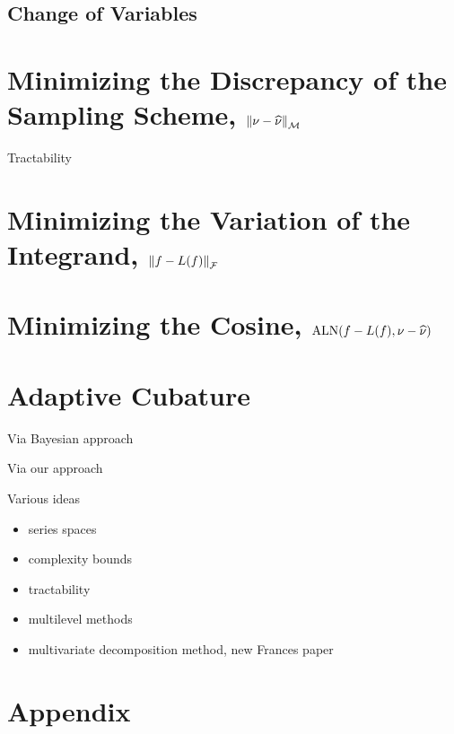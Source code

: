 \documentclass[graybox]{svmult}
\DeclareMathOperator{\algn}{ALN}
\begin{document}
\subsection{Change of Variables}


\section{Minimizing the Discrepancy of the Sampling Scheme, $\left \lVert \nu - \widehat{\nu} \right \rVert_{\mathcal{M}}$}

Tractability

\section{Minimizing the Variation of the Integrand, $\left \lVert f - L(f) \right \rVert_{\mathcal{F}}$}

\section{Minimizing the Cosine, $\algn(f - L(f),\nu - \hnu)$}

\section{Adaptive Cubature}
Via Bayesian approach

Via our approach

Various ideas
\begin{itemize}
\item series spaces
\item complexity bounds
\item tractability
\item multilevel methods
\item multivariate decomposition method, new Frances paper
\end{itemize}




\appendix
\section{Appendix}
\end{document}
